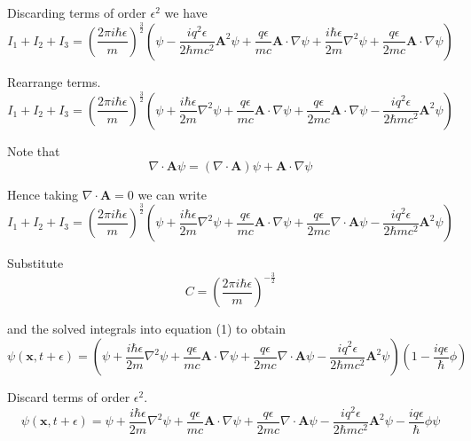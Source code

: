 Discarding terms of order $\epsilon^2$ we have
\begin{equation*}
I_1+I_2+I_3=\left(\frac{2\pi i\hbar\epsilon}{m}\right)^\frac{3}{2}
\left(\psi-\frac{iq^2\epsilon}{2\hbar mc^2}\mathbf A^2\psi
+\frac{q\epsilon}{mc}\mathbf A\cdot\nabla\psi
+\frac{i\hbar\epsilon}{2m}\nabla^2\psi
+\frac{q\epsilon}{2mc}\mathbf A\cdot\nabla\psi
\right)
\end{equation*}

Rearrange terms.
\begin{equation*}
I_1+I_2+I_3=\left(\frac{2\pi i\hbar\epsilon}{m}\right)^\frac{3}{2}
\left(
\psi
+\frac{i\hbar\epsilon}{2m}\nabla^2\psi
+\frac{q\epsilon}{mc}\mathbf A\cdot\nabla\psi
+\frac{q\epsilon}{2mc}\mathbf A\cdot\nabla\psi
-\frac{iq^2\epsilon}{2\hbar mc^2}\mathbf A^2\psi
\right)
\end{equation*}

Note that
\begin{equation*}
\nabla\cdot\mathbf A\psi=(\nabla\cdot\mathbf A)\psi+\mathbf A\cdot\nabla\psi
\end{equation*}

Hence taking $\nabla\cdot\mathbf A=0$ we can write
\begin{equation*}
I_1+I_2+I_3=\left(\frac{2\pi i\hbar\epsilon}{m}\right)^\frac{3}{2}
\left(
\psi+
\frac{i\hbar\epsilon}{2m}\nabla^2\psi
+\frac{q\epsilon}{mc}\mathbf A\cdot\nabla\psi
+\frac{q\epsilon}{2mc}\nabla\cdot\mathbf A\psi
-\frac{iq^2\epsilon}{2\hbar mc^2}\mathbf A^2\psi
\right)
\end{equation*}

Substitute
\begin{equation*}
C=\left(\frac{2\pi i\hbar\epsilon}{m}\right)^{-\frac{3}{2}}
\end{equation*}

and the solved integrals into equation (1) to obtain
\begin{equation*}
\psi(\mathbf x,t+\epsilon)
=\left(\psi
+\frac{i\hbar\epsilon}{2m}\nabla^2\psi
+\frac{q\epsilon}{mc}\mathbf A\cdot\nabla\psi
+\frac{q\epsilon}{2mc}\nabla\cdot\mathbf A\psi
-\frac{iq^2\epsilon}{2\hbar mc^2}\mathbf A^2\psi
\right)
\left(1-\frac{iq\epsilon}{\hbar}\phi\right)
\end{equation*}

Discard terms of order $\epsilon^2$.
\begin{equation*}
\psi(\mathbf x,t+\epsilon)
=\psi
+\frac{i\hbar\epsilon}{2m}\nabla^2\psi
+\frac{q\epsilon}{mc}\mathbf A\cdot\nabla\psi
+\frac{q\epsilon}{2mc}\nabla\cdot\mathbf A\psi
-\frac{iq^2\epsilon}{2\hbar mc^2}\mathbf A^2\psi
-\frac{iq\epsilon}{\hbar}\phi\psi
\end{equation*}

